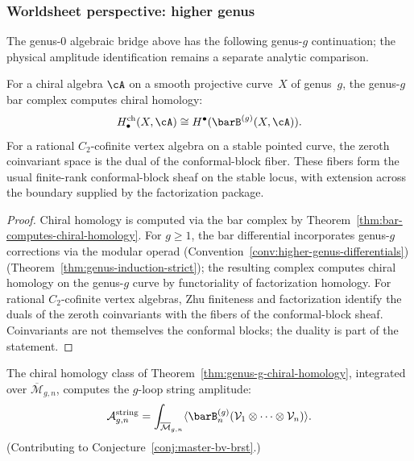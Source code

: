 \subsubsection{Worldsheet perspective: higher genus}

The genus-$0$ algebraic bridge above has the following genus-$g$
continuation; the physical amplitude identification remains a separate
analytic comparison.

\begin{theorem}
\label{thm:genus-g-chiral-homology}
For a chiral algebra $\cA$ on a smooth projective
curve~$X$ of genus~$g$, the genus-$g$ bar complex
computes chiral homology:
\[
H_\bullet^{\mathrm{ch}}(X,\cA)
\cong H^\bullet(\barB^{(g)}(X,\cA)).
\]
For a rational $C_2$-cofinite vertex algebra on a stable pointed
curve, the zeroth coinvariant space is the dual of the conformal-block
fiber. These fibers form the usual finite-rank conformal-block sheaf on
the stable locus, with extension across the boundary supplied by the
factorization package.
\end{theorem}

\begin{proof}
Chiral homology is computed via the bar complex by
Theorem~\ref{thm:bar-computes-chiral-homology}.
For $g \geq 1$, the bar differential incorporates
genus-$g$ corrections via the modular operad
(Convention~\ref{conv:higher-genus-differentials})
(Theorem~\ref{thm:genus-induction-strict}); the
resulting complex computes chiral homology on the
genus-$g$ curve by functoriality of factorization homology. For
rational $C_2$-cofinite vertex algebras, Zhu finiteness and
factorization identify the duals of the zeroth coinvariants with the
fibers of the conformal-block sheaf. Coinvariants are not themselves
the conformal blocks; the duality is part of the statement.
\end{proof}

\begin{conjecture}
\label{conj:string-amplitude-higher-genus}
The chiral homology class of
Theorem~\ref{thm:genus-g-chiral-homology}, integrated
over $\overline{\mathcal{M}}_{g,n}$, computes the
$g$-loop string amplitude:
\[
\mathcal{A}_{g,n}^{\mathrm{string}}
= \int_{\overline{\mathcal{M}}_{g,n}}
\langle \barB^{(g)}_n
(\mathcal{V}_1 \otimes \cdots
\otimes \mathcal{V}_n) \rangle.
\]
(Contributing to Conjecture~\ref{conj:master-bv-brst}.)
\end{conjecture}

